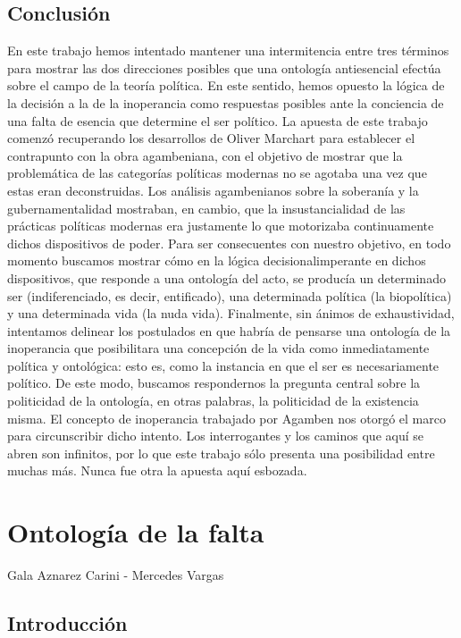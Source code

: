 \section{Conclusión}

En este trabajo hemos intentado mantener una intermitencia entre tres términos  para mostrar las dos direcciones posibles que una ontología antiesencial efectúa sobre el campo de la teoría política. En este sentido, hemos opuesto la lógica de la decisión a la de la inoperancia como respuestas posibles ante la conciencia de una falta de esencia que determine el ser político. La apuesta de este trabajo comenzó recuperando los desarrollos de Oliver Marchart para establecer el contrapunto con la obra agambeniana, con el objetivo de mostrar que la problemática de las categorías políticas modernas no se agotaba una vez que estas eran deconstruidas. Los análisis agambenianos sobre la soberanía y la gubernamentalidad mostraban, en cambio, que la insustancialidad de las prácticas políticas modernas era justamente lo que motorizaba continuamente dichos dispositivos de poder. Para ser consecuentes con nuestro objetivo, en todo momento buscamos mostrar cómo en la lógica decisionalimperante en dichos dispositivos, que responde a una ontología del acto, se producía un determinado ser (indiferenciado, es decir, entificado), una determinada política (la biopolítica) y una determinada vida (la nuda vida). Finalmente, sin ánimos de exhaustividad, intentamos delinear los postulados en que habría de pensarse una ontología de la inoperancia que posibilitara una concepción de la vida como inmediatamente política y ontológica: esto es, como la instancia en que el ser es necesariamente político. De este modo, buscamos respondernos la pregunta central sobre la politicidad de la ontología, en otras palabras, la politicidad de la existencia misma. El concepto de inoperancia trabajado por Agamben nos otorgó el marco para circunscribir dicho intento. Los interrogantes y los caminos que aquí se abren son infinitos, por lo que este trabajo sólo presenta una posibilidad entre muchas más. Nunca fue otra la apuesta aquí esbozada.

\chapter{Ontología de la falta}

Gala Aznarez Carini - Mercedes Vargas

\section{Introducción}

